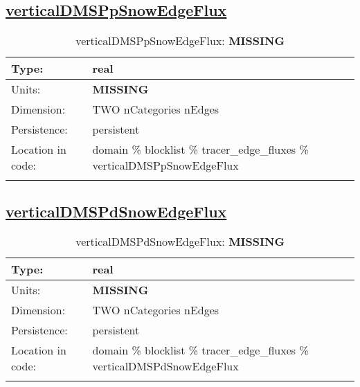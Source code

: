 \subsection[verticalDMSPpSnowEdgeFlux]{\hyperref[sec:var_tab_tracer_edge_fluxes]{verticalDMSPpSnowEdgeFlux}}
\label{subsec:var_sec_tracer_edge_fluxes_verticalDMSPpSnowEdgeFlux}
\begin{center}
\begin{longtable}{| p{2.0in} | p{4.0in} |}
        \hline 
        Type: & real \\
        \hline 
        Units: & {\bf \color{red} MISSING} \\
        \hline 
        Dimension: & TWO nCategories nEdges \\
        \hline 
        Persistence: & persistent \\
        \hline 
         Location in code: & domain \% blocklist \% tracer\_edge\_fluxes \% verticalDMSPpSnowEdgeFlux \\
         \hline 
    \caption{verticalDMSPpSnowEdgeFlux: {\bf \color{red} MISSING}}
\end{longtable}
\end{center}
\subsection[verticalDMSPdSnowEdgeFlux]{\hyperref[sec:var_tab_tracer_edge_fluxes]{verticalDMSPdSnowEdgeFlux}}
\label{subsec:var_sec_tracer_edge_fluxes_verticalDMSPdSnowEdgeFlux}
\begin{center}
\begin{longtable}{| p{2.0in} | p{4.0in} |}
        \hline 
        Type: & real \\
        \hline 
        Units: & {\bf \color{red} MISSING} \\
        \hline 
        Dimension: & TWO nCategories nEdges \\
        \hline 
        Persistence: & persistent \\
        \hline 
         Location in code: & domain \% blocklist \% tracer\_edge\_fluxes \% verticalDMSPdSnowEdgeFlux \\
         \hline 
    \caption{verticalDMSPdSnowEdgeFlux: {\bf \color{red} MISSING}}
\end{longtable}
\end{center}
